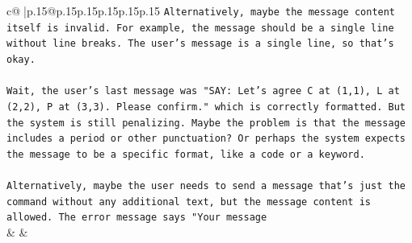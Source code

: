 \documentclass{article}
\begin{document}
{\begin{supertabular}{c@{$\;$}|p{.15\linewidth}@{}p{.15\linewidth}p{.15\linewidth}p{.15\linewidth}p{.15\linewidth}p{.15\linewidth}}
{{{\texttt{Alternatively, maybe the message content itself is invalid. For example, the message should be a single line without line breaks. The user's message is a single line, so that's okay. } \\
\\ 
\texttt{Wait, the user's last message was "SAY: Let's agree C at (1,1), L at (2,2), P at (3,3). Please confirm." which is correctly formatted. But the system is still penalizing. Maybe the problem is that the message includes a period or other punctuation? Or perhaps the system expects the message to be a specific format, like a code or a keyword.} \\
\\ 
\texttt{Alternatively, maybe the user needs to send a message that's just the command without any additional text, but the message content is allowed. The error message says "Your message} \\
            }
        }
    }
    & & \\ \\


\end{supertabular}}
\end{document}
